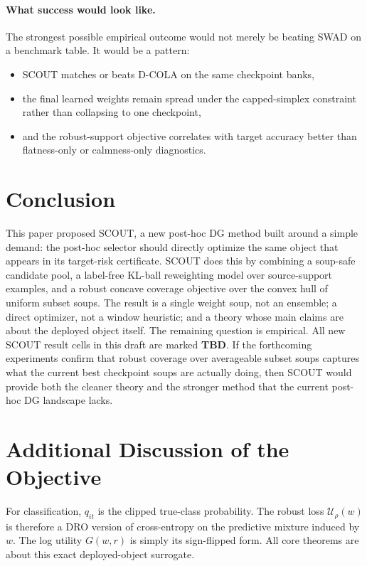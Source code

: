 \documentclass{article}
\newcommand{\TBD}{\textbf{TBD}}
\newcommand{\scout}{\textup{\textsc{SCOUT}}}
\newcommand{\swad}{\textup{\textsc{SWAD}}}
\newcommand{\dcola}{\textup{\textsc{D-COLA}}}
\begin{document}
\paragraph{What success would look like.}
The strongest possible empirical outcome would not merely be beating \swad{} on a benchmark table. It would be a pattern:
\begin{itemize}[leftmargin=1.4em]
    \item \scout{} matches or beats \dcola{} on the same checkpoint banks,
    \item the final learned weights remain spread under the capped-simplex constraint rather than collapsing to one checkpoint,
    \item and the robust-support objective correlates with target accuracy better than flatness-only or calmness-only diagnostics.
\end{itemize}

\section{Conclusion}

This paper proposed \scout{}, a new post-hoc DG method built around a simple demand: the post-hoc selector should directly optimize the same object that appears in its target-risk certificate. \scout{} does this by combining a soup-safe candidate pool, a label-free KL-ball reweighting model over source-support examples, and a robust concave coverage objective over the convex hull of uniform subset soups. The result is a single weight soup, not an ensemble; a direct optimizer, not a window heuristic; and a theory whose main claims are about the deployed object itself. The remaining question is empirical. All new \scout{} result cells in this draft are marked \TBD{}. If the forthcoming experiments confirm that robust coverage over averageable subset soups captures what the current best checkpoint soups are actually doing, then \scout{} would provide both the cleaner theory and the stronger method that the current post-hoc DG landscape lacks.




\appendix

\section{Additional Discussion of the Objective}

For classification, \(q_{it}\) is the clipped true-class probability. The robust loss \(\mathcal{U}_\rho(w)\) is therefore a DRO version of cross-entropy on the predictive mixture induced by \(w\). The log utility \(G(w,r)\) is simply its sign-flipped form. All core theorems are about this exact deployed-object surrogate.
\end{document}
